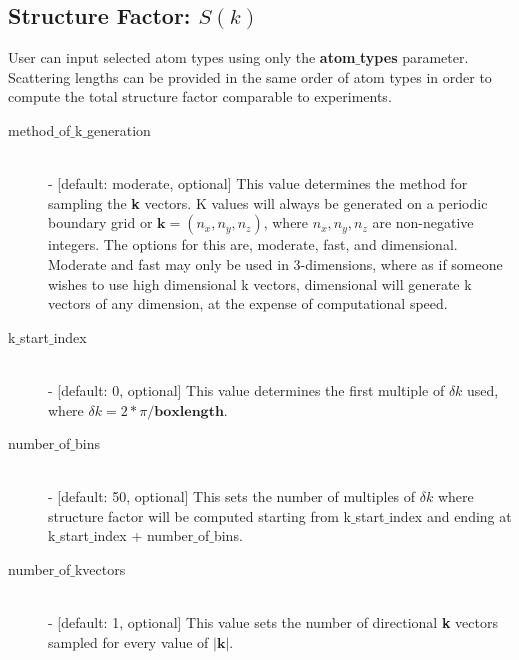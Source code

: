 \documentclass{article}
\begin{document}
\subsection{Structure Factor: $S(k)$} \label{sec::sofk_parm}
User can input selected atom types using only the \textbf{atom$\_$types} parameter.  Scattering lengths can be provided in the same order of atom types in order to compute the total structure factor comparable to experiments.
\begin{description}		
	\item[method$\_$of$\_$k$\_$generation] \hfill \\
	- [default: moderate, optional] This value determines the method for sampling the \textbf{k} vectors.  K values will always be generated on a periodic boundary grid or $\mathbf{k} = (n_x,n_y,n_z)$, where $n_x, n_y, n_z$ are non-negative integers.  The options for this are, moderate, fast, and dimensional.  Moderate and fast may only be used in 3-dimensions, where as if someone wishes to use high dimensional k vectors, dimensional will generate k vectors of any dimension, at the expense of computational speed.

	\item[k$\_$start$\_$index] \hfill \\
	- [default: 0, optional] This value determines the first multiple of $\delta k$ used, where $\delta k = 2*\pi/\textbf{boxlength}$.  
		
	\item[number$\_$of$\_$bins] \hfill \\
	- [default: 50, optional] This sets the number of multiples of $\delta k$ where structure factor will be computed starting from k$\_$start$\_$index and ending at k$\_$start$\_$index + number$\_$of$\_$bins. 
	
	\item[number$\_$of$\_$kvectors] \hfill \\
	- [default: 1, optional] This value sets the number of directional \textbf{k} vectors sampled for every value of $|\bm{k}|$.  

\end{description}
\end{document}
